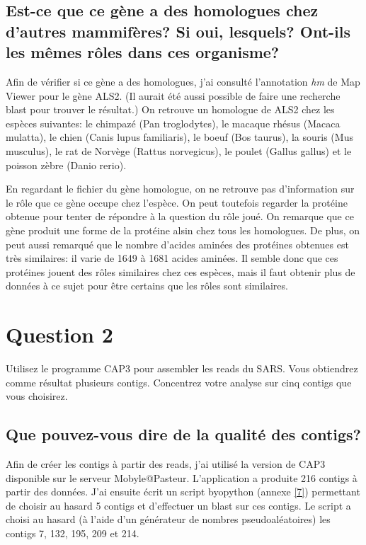 \documentclass[11pt]{article} %
\begin{document}
\subsection[Homologues du gène ALS2]{Est-ce que ce gène a des homologues chez d'autres mammifères? Si oui, lesquels? Ont-ils les
mêmes rôles dans ces organisme?}

Afin de vérifier si ce gène a des homologues, j'ai consulté l'annotation \emph{hm} de Map Viewer pour le gène ALS2. (Il aurait
été aussi possible de faire une recherche blast pour trouver le résultat.) On retrouve un homologue de ALS2 chez les espèces suivantes:
le chimpazé (Pan troglodytes), le macaque rhésus (Macaca mulatta), le chien (Canis lupus familiaris), le boeuf (Bos taurus), la souris
(Mus musculus), le rat de Norvège (Rattus norvegicus), le poulet (Gallus gallus) et le poisson zèbre (Danio rerio). 

En regardant le fichier du gène homologue, on ne retrouve pas d'information sur le rôle que ce gène occupe
chez l'espèce. On peut toutefois regarder la protéine obtenue pour tenter de répondre à la question du rôle joué.
On remarque que ce gène produit une forme de la protéine alsin chez tous les homologues. De plus, on peut aussi remarqué
que le nombre d'acides aminées des protéines obtenues est très similaires: il varie de 1649 à 1681 acides aminées. Il semble
donc que ces protéines jouent des rôles similaires chez ces espèces, mais il faut obtenir plus de données à ce sujet pour être 
certains que les rôles sont similaires.

 
\section{Question 2} %

Utilisez le programme CAP3 pour assembler les reads du SARS. Vous obtiendrez comme résultat plusieurs contigs. Concentrez
votre analyse sur cinq contigs que vous choisirez.

\subsection[Qualité des contigs]{Que pouvez-vous dire de la qualité des contigs?}

Afin de créer les contigs à partir des reads, j'ai utilisé la version de CAP3 disponible sur le serveur Mobyle@Pasteur.
L'application a produite 216 contigs à partir des données. J'ai ensuite écrit un script byopython (annexe \ref{7}) permettant de choisir
au hasard 5 contigs et d'effectuer un blast sur ces contigs. Le script a choisi au hasard (à l'aide d'un générateur de
nombres pseudoaléatoires) les contigs 7, 132, 195, 209 et 214.
\end{document}
